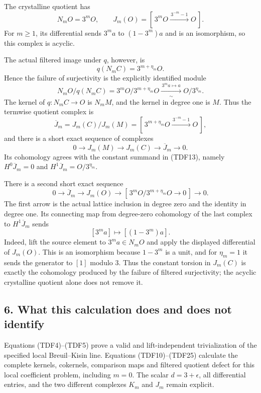 \documentclass[
  10pt,
]{article}
\begin{document}
The crystalline quotient has \[
 N_mO=3^mO,\qquad
 J_m(O)=[\,3^mO\xrightarrow{\,3^{-m}-1\,}O\,].
 \tag{TDF20}
\] For \(m\geq1\), its differential sends \(3^ma\) to \((1-3^m)a\) and
is an isomorphism, so this complex is acyclic.

The actual filtered image under \(q\), however, is \[
 q(N_mC)=3^{m+\eta_m}O.
\] Hence the failure of surjectivity is the explicitly identified module
\[
 N_mO/q(N_mC)
 =3^mO/3^{m+\eta_m}O
 \xrightarrow[\sim]{\,3^ma\mapsto a\,}O/3^{\eta_m}.
 \tag{TDF21}
\] The kernel of \(q:N_mC\to O\) is \(N_mM\), and the kernel in degree
one is \(M\). Thus the termwise quotient complex is \[
 \overline J_m=J_m(C)/J_m(M)
 =[\,3^{m+\eta_m}O\xrightarrow{\,3^{-m}-1\,}O\,],
 \tag{TDF22}
\] and there is a short exact sequence of complexes \[
 0\longrightarrow J_m(M)\longrightarrow J_m(C)
 \longrightarrow\overline J_m\longrightarrow0.
 \tag{TDF23}
\] Its cohomology agrees with the constant summand in (TDF13), namely
\(H^0\overline J_m=0\) and \(H^1\overline J_m=O/3^{\eta_m}\).

There is a second short exact sequence \[
 0\longrightarrow\overline J_m\longrightarrow J_m(O)
 \longrightarrow
 [\,3^mO/3^{m+\eta_m}O\longrightarrow0\,]
 \longrightarrow0.
 \tag{TDF24}
\] The first arrow is the actual lattice inclusion in degree zero and
the identity in degree one. Its connecting map from degree-zero
cohomology of the last complex to \(H^1\overline J_m\) sends \[
 [3^ma]\longmapsto[(1-3^m)a].
 \tag{TDF25}
\] Indeed, lift the source element to \(3^ma\in N_mO\) and apply the
displayed differential of \(J_m(O)\). This is an isomorphism because
\(1-3^m\) is a unit, and for \(\eta_m=1\) it sends the generator to
\([1]\) modulo \(3\). Thus the constant torsion in \(J_m(C)\) is exactly
the cohomology produced by the failure of filtered surjectivity; the
acyclic crystalline quotient alone does not remove it.

\subsection{6. What this calculation does and does not
identify}\label{what-this-calculation-does-and-does-not-identify}

Equations (TDF4)--(TDF5) prove a valid and lift-independent
trivialization of the specified local Breuil--Kisin line. Equations
(TDF10)--(TDF25) calculate the complete kernels, cokernels, comparison
maps and filtered quotient defect for this local coefficient problem,
including \(m=0\). The scalar \(d=3+\epsilon\), all differential
entries, and the two different complexes \(K_m\) and \(J_m\) remain
explicit.
\end{document}
